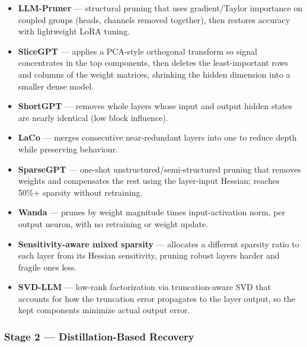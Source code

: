 \begin{itemize}

  \item \textbf{LLM-Pruner} \cite{ma2023llmpruner} --- structural pruning that uses gradient/Taylor importance on coupled groups (heads, channels removed together), then restores accuracy with lightweight LoRA tuning.

  \item \textbf{SliceGPT} \cite{ashkboos2024slicegpt} --- applies a PCA-style orthogonal transform so signal concentrates in the top components, then deletes the least-important rows and columns of the weight matrices, shrinking the hidden dimension into a smaller dense model.

  \item \textbf{ShortGPT} \cite{men2024shortgpt} --- removes whole layers whose input and output hidden states are nearly identical (low block influence).

  \item \textbf{LaCo} \cite{yang2024laco} --- merges consecutive near-redundant layers into one to reduce depth while preserving behaviour.

  \item \textbf{SparseGPT} \cite{frantar2023sparsegpt} --- one-shot unstructured/semi-structured pruning that removes weights and compensates the rest using the layer-input Hessian; reaches 50\%+ sparsity without retraining.

  \item \textbf{Wanda} \cite{sun2024wanda} --- prunes by weight magnitude times input-activation norm, per output neuron, with no retraining or weight update.

  \item \textbf{Sensitivity-aware mixed sparsity} \cite{shao2024sensitivity} --- allocates a different sparsity ratio to each layer from its Hessian sensitivity, pruning robust layers harder and fragile ones less.

  \item \textbf{SVD-LLM} \cite{wang2025svdllm} --- low-rank factorization via truncation-aware SVD that accounts for how the truncation error propagates to the layer output, so the kept components minimize actual output error.

\end{itemize}

\subsubsection{Stage 2 --- Distillation-Based Recovery}

